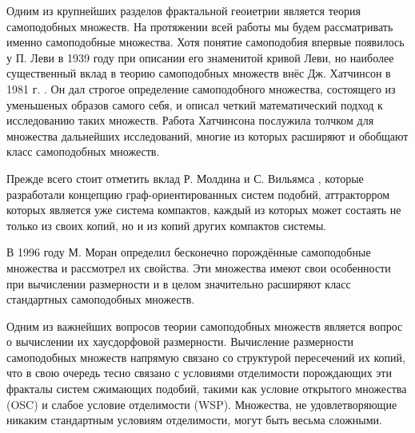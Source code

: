 Одним из крупнейших разделов фрактальной геоиетрии является теория самоподобных множеств.
На протяжении всей работы мы будем рассматривать именно самоподобные множества.
Хотя понятие самоподобия впервые появилось у П. Леви в 1939 году \cite{Levy1939} при описании его знаменитой кривой Леви, но наиболее существенный вклад в теорию самоподобных множеств внёс Дж. Хатчинсон в 1981 г. \cite{Hut1981}.
Он дал строгое определение самоподобного множества, состоящего из уменьшеных образов самого себя, и описал четкий математический подход к исследованию таких множеств. 
Работа Хатчинсона послужила толчком для множества дальнейших исследований, многие из которых расширяют и обобщают класс самоподобных множеств.

Прежде всего стоит отметить вклад Р. Молдина и С. Вильямса \cite{MW1988}, которые разработали концепцию граф-ориентированных систем подобий, аттракторром которых является уже система компактов, каждый из которых может состаять не только из своих копий, но и из копий других компактов системы.

В 1996 году М. Моран \cite{Moran1996} определил бесконечно порождённые самоподобные множества и рассмотрел их свойства.
Эти множества имеют свои особенности при вычислении размерности и в целом значительно расширяют класс стандартных самоподобных множеств.

Одним из важнейших вопросов теории самоподобных множеств является вопрос о вычислении их хаусдорфовой размерности.
Вычисление размерности самоподобных множеств напрямую связано со структурой пересечений их копий, что в свою очередь тесно связано с условиями отделимости порождающих эти фракталы систем сжимающих подобий, такими как условие открытого множества (OSC) и слабое условие отделимости (WSP).
Множества, не удовлетворяющие никаким стандартным условиям отделимости, могут быть весьма сложными.


